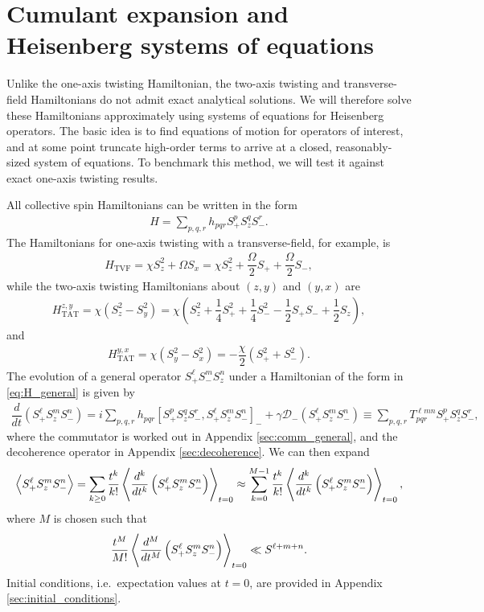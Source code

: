 \documentclass[aps,notitlepage,nofootinbib,11pt]{revtex4-1}
\renewcommand{\t}{\text} %
\newcommand{\f}[2]{\dfrac{#1}{#2}} %
\newcommand{\p}[1]{\left(#1\right)} %
\renewcommand{\sp}[1]{\left[#1\right]} %
\newcommand{\bk}{\Braket} %
\newcommand{\D}{\mathcal{D}}
\newcommand{\1}{\mathds{1}}
\begin{document}
\section{Cumulant expansion and Heisenberg systems of equations}

Unlike the one-axis twisting Hamiltonian, the two-axis twisting and
transverse-field Hamiltonians do not admit exact analytical
solutions. We will therefore solve these Hamiltonians approximately
using systems of equations for Heisenberg operators.  The basic idea
is to find equations of motion for operators of interest, and at some
point truncate high-order terms to arrive at a closed,
reasonably-sized system of equations.  To benchmark this method, we
will test it against exact one-axis twisting results.

All collective spin Hamiltonians can be written in the form
\begin{align}
  H = \sum_{p,q,r} h_{pqr} S_+^p S_z^q S_-^r.
  \label{eq:H_general}
\end{align}
The Hamiltonians for one-axis twisting with a transverse-field, for
example, is
\begin{align}
  H_{\t{TVF}}
  = \chi S_z^2 + \Omega S_x
  = \chi S_z^2 + \f{\Omega}{2} S_+ + \f{\Omega}{2} S_-,
\end{align}
while the two-axis twisting Hamiltonians about $\p{z,y}$ and $\p{y,x}$
are
\begin{align}
  H_{\t{TAT}}^{z,y}
  = \chi \p{S_z^2 - S_y^2}
  = \chi \p{S_z^2 + \f14 S_+^2 + \f14 S_-^2 - \f12 S_+ S_- + \f12 S_z},
\end{align}
and
\begin{align}
  H_{\t{TAT}}^{y,x}
  = \chi\p{S_y^2 - S_x^2}
  = -\f{\chi}{2} \p{S_+^2 + S_-^2}.
\end{align}
The evolution of a general operator $S_+^\ell S_-^m S_z^n$ under a
Hamiltonian of the form in \eqref{eq:H_general} is given by
\begin{align}
  \f{d}{dt} \p{S_+^\ell S_z^m S_-^n}
  = i\sum_{p,q,r} h_{pqr} \sp{S_+^p S_z^q S_-^r, S_+^\ell S_z^m S_-^n}_-
  + \gamma \D_-\p{S_+^\ell S_z^m S_-^n}
  \equiv \sum_{p,q,r} T^{\ell m n}_{pqr} S_+^p S_z^q S_-^r,
\end{align}
where the commutator is worked out in Appendix \ref{sec:comm_general},
and the decoherence operator in Appendix \ref{sec:decoherence}.  We
can then expand
\begin{align}
  \bk{S_+^\ell S_z^m S_-^n}
  = \sum_{k\ge0} \f{t^k}{k!}
  \bk{\f{d^k}{dt^k}\p{S_+^\ell S_z^m S_-^n}}_{t=0}
  \approx \sum_{k=0}^{M-1} \f{t^k}{k!}
  \bk{\f{d^k}{dt^k}\p{S_+^\ell S_z^m S_-^n}}_{t=0},
\end{align}
where $M$ is chosen such that
\begin{align}
  \f{t^M}{M!} \bk{\f{d^M}{dt^M}\p{S_+^\ell S_z^m S_-^n}}_{t=0}
  \ll S^{\ell+m+n}.
\end{align}
Initial conditions, i.e.~expectation values at $t=0$, are provided in
Appendix \ref{sec:initial_conditions}.
\end{document}
